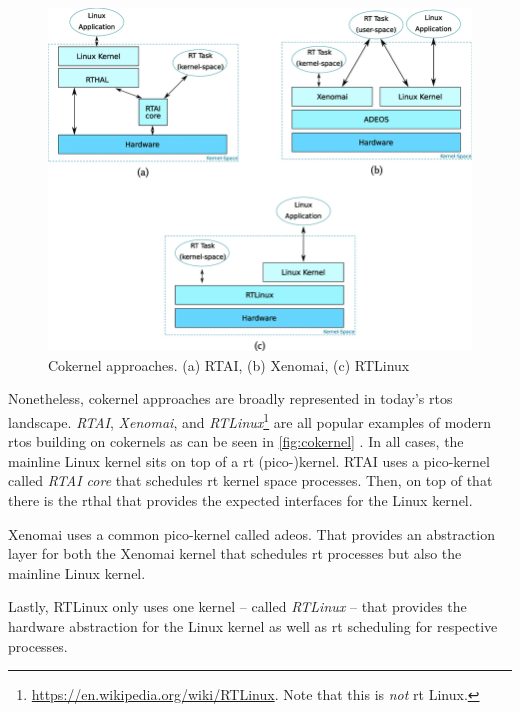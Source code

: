 \documentclass[10pt,twocolumn,a4paper]{article}
\begin{document}
\begin{figure}[hbt]
  \centering
  \includegraphics[scale=.26, clip]{assets/cokernel.png}
  \caption{Cokernel approaches. (a) RTAI, (b) Xenomai, (c) RTLinux \cite{reghenzani_realtime_2019} \label{fig:cokernel}}
\end{figure}
Nonetheless, cokernel approaches are broadly represented in today's \acrshort{rtos} landscape.
\emph{RTAI}\cite{rtai-docs}, \emph{Xenomai}\cite{xenomai-docs}, and \emph{RTLinux}\footnote{\url{https://en.wikipedia.org/wiki/RTLinux}. Note that this is \emph{not} \acrlong{rt} Linux.} are all popular examples of modern \acrshort{rtos} building on cokernels as can be seen in \autoref{fig:cokernel} \cite{reghenzani_realtime_2019}.
In all cases, the mainline Linux kernel sits on top of a \acrshort{rt} (pico-)kernel.
RTAI uses a pico-kernel called \emph{RTAI core} that schedules \acrshort{rt} kernel space processes.
Then, on top of that there is the \acrfull{rthal} that provides the expected interfaces for the Linux kernel.

Xenomai uses a common pico-kernel called \acrfull{adeos}.
That provides an abstraction layer for both the Xenomai kernel that schedules \acrshort{rt} processes but also the mainline Linux kernel.

Lastly, RTLinux only uses one kernel -- called \emph{RTLinux} -- that provides the hardware abstraction for the Linux kernel as well as \acrshort{rt} scheduling for respective processes.
\newline
\end{document}
